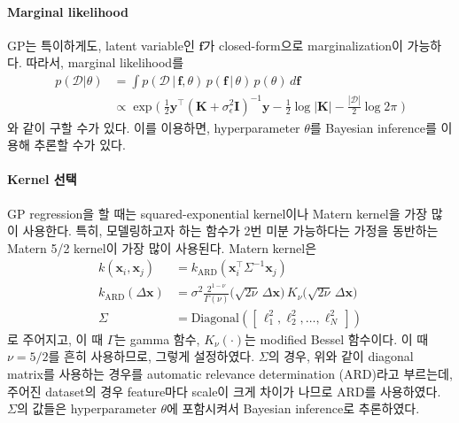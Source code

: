 \documentclass[ba]{imsart}
\newcommand{\vf}{\mathbf{f}}
\newcommand{\vx}{\mathbf{x}}
\newcommand{\vy}{\mathbf{y}}
\newcommand{\mI}{\mathbf{I}}
\newcommand{\mK}{\mathbf{K}}
\begin{document}
\paragraph{Marginal likelihood}
GP는 특이하게도, latent variable인 \(\vf\)가 closed-form으로 marginalization이 가능하다.
따라서, marginal likelihood를
\begin{align}
  p(\mathcal{D} | \theta) &= \int p(\mathcal{D} \,|\, \vf, \theta) \, p(\vf \,|\, \theta) \, p(\theta) \, d\vf \\
  &\propto \exp\Big(\;  \frac{1}{2} \vy^{\top} {(\mK + \sigma^2_{\epsilon} \mI)}^{-1} \vy - \frac{1}{2} \log{|\mathbf{K}|} - \frac{|\mathcal{D}|}{2} \log{2 \pi} \;\Big)
\end{align}
와 같이 구할 수가 있다.
이를 이용하면, hyperparameter \(\theta\)를 Bayesian inference를 이용해 추론할 수가 있다.

\paragraph{Kernel 선택}
GP regression을 할 때는 squared-exponential kernel이나 Matern kernel을 가장 많이 사용한다.
특히, 모델링하고자 하는 함수가 2번 미분 가능하다는 가정을 동반하는 Matern 5/2 kernel이 가장 많이 사용된다.
Matern kernel은
\begin{align}
  k(\vx_i, \vx_j) &= k_{\text{ARD}}( \vx_i^{\top} \Sigma^{-1}  \vx_j )\\
  k_{\text{ARD}}(\Delta \vx)  &= \sigma^2 \frac{2^{1 - \nu}}{\Gamma(\nu)} \big( \sqrt{2 \nu} \, \Delta\vx \big) \, K_\nu \big( \sqrt{2 \nu} \, \Delta \vx \big) \\
  \Sigma &= \text{Diagonal}([\, \ell_1^2, \ell_2^2, \ldots, \ell_N^2 \,])
\end{align}
로 주어지고, 이 때 \(\Gamma\)는 gamma 함수, \(K_\nu(\cdot)\)는 modified Bessel 함수이다.
이 때 \(\nu = 5/2\)를 흔히 사용하므로, 그렇게 설정하였다.
\(\Sigma\)의 경우, 위와 같이 diagonal matrix를 사용하는 경우를 automatic relevance determination (ARD)라고 부르는데, 주어진 dataset의 경우 feature마다 scale이 크게 차이가 나므로 ARD를 사용하였다.
\(\Sigma\)의 값들은 hyperparameter \(\theta\)에 포함시켜서 Bayesian inference로 추론하였다.
\end{document}
